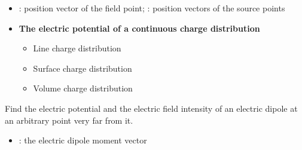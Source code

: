 \begin{ELjoin}

\begin{itemize}
\item
  : position vector of the field point; : position vectors of the source points
\item
  \textbf{The electric potential of a continuous charge distribution}

  \begin{itemize}
  \item
    Line charge distribution
  \item
    Surface charge distribution
  \item
    Volume charge distribution
  \end{itemize}
\end{itemize}


\begin{ELexample}{}

Find the electric potential and the electric field intensity of an electric dipole at an arbitrary point very far from it.

\begin{ELsolution}




\begin{itemize}
\tightlist
\item
  : the electric dipole moment vector
\end{itemize}


\end{ELsolution}
\end{ELexample}
\end{ELjoin}
